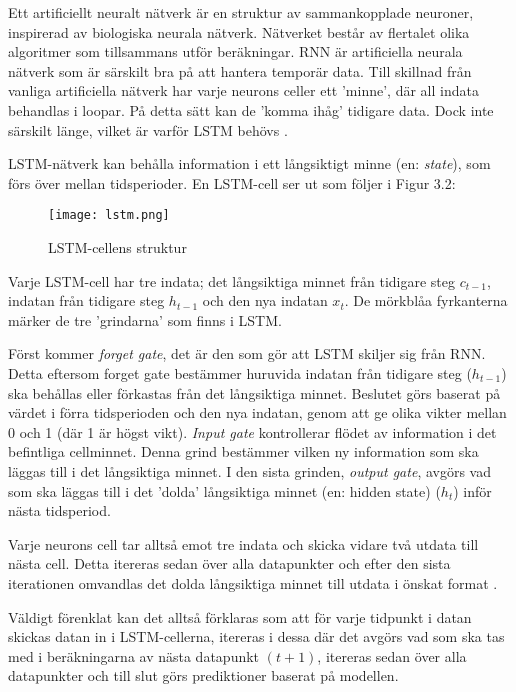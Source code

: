 \documentclass[11pt]{article}
\numberwithin{equation}{section}
\numberwithin{table}{section}
\numberwithin{figure}{section}
\begin{document}
Ett artificiellt neuralt nätverk är en struktur av sammankopplade neuroner, inspirerad av biologiska neurala nätverk. Nätverket består av flertalet olika algoritmer som tillsammans utför beräkningar. RNN är artificiella neurala nätverk som är särskilt bra på att hantera temporär data. Till skillnad från vanliga artificiella nätverk har varje neurons celler ett 'minne', där all indata behandlas i loopar. På detta sätt kan de 'komma ihåg' tidigare data. Dock inte särskilt länge, vilket är varför LSTM behövs \parencite[][,s.269-319]{purkait2019hands}. 

LSTM-nätverk kan behålla information i ett långsiktigt minne (en: \textit{state}), som förs över mellan tidsperioder. En LSTM-cell ser ut som följer i Figur 3.2:
\begin{figure}[H]
\caption{LSTM-cellens struktur \parencite[lånad från][]{yuan2019nonlinear}}
\texttt{[image: lstm.png]}
\centering
\end{figure}

Varje LSTM-cell har tre indata; det långsiktiga minnet från tidigare steg \(c_{t-1}\), indatan från tidigare steg \(h_{t-1}\) och den nya indatan \(x_{t}\). De mörkblåa fyrkanterna märker de tre 'grindarna' som finns i LSTM. 

Först kommer \textit{forget gate}, det är den som gör att LSTM skiljer sig från RNN. Detta eftersom forget gate bestämmer huruvida indatan från tidigare steg (\(h_{t-1}\)) ska behållas eller förkastas från det långsiktiga minnet. Beslutet görs baserat på värdet i förra tidsperioden och den nya indatan, genom att ge olika vikter mellan 0 och 1 (där 1 är högst vikt). \textit{Input gate} kontrollerar flödet av information i det befintliga cellminnet. Denna grind bestämmer vilken ny information som ska läggas till i det långsiktiga minnet. I den sista grinden, \textit{output gate}, avgörs vad som ska läggas till i det 'dolda' långsiktiga minnet (en: hidden state) (\(h_{t}\)) inför nästa tidsperiod.

Varje neurons cell tar alltså emot tre indata och skicka vidare två utdata till nästa cell. Detta itereras sedan över alla datapunkter och efter den sista iterationen omvandlas det dolda långsiktiga minnet till utdata i önskat format \parencite[][,s.269-319]{purkait2019hands}.

Väldigt förenklat kan det alltså förklaras som  att för varje tidpunkt i datan skickas datan in i LSTM-cellerna, itereras i dessa där det avgörs vad som ska tas med i beräkningarna av nästa datapunkt $(t+1)$, itereras sedan över alla datapunkter och till slut görs prediktioner baserat på modellen. 
\end{document}
